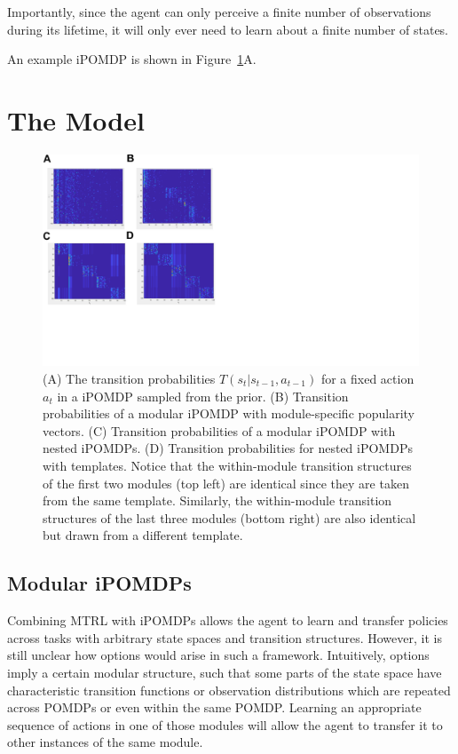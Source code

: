 \documentclass[11pt]{article}
\begin{document}
Importantly, since the agent can only perceive a finite number of observations during its lifetime, it will only ever need to learn about a finite number of states.

An example iPOMDP is shown in Figure~\ref{fig:nested}A.

\section{The Model}


\begin{figure}
\centering
\includegraphics[scale=1,  trim = 0 120 400 10]{figures/nested.pdf}
\caption{(A) The transition probabilities $T(s_t| s_{t-1}, a_{t-1})$ for a fixed action $a_t$ in a iPOMDP sampled from the prior. (B) Transition probabilities of a modular iPOMDP with module-specific popularity vectors. (C) Transition probabilities of a modular iPOMDP with nested iPOMDPs. (D) Transition probabilities for nested iPOMDPs with templates. Notice that the within-module transition structures of the first two modules (top left) are identical since they are taken from the same template. Similarly, the within-module transition structures of the last three modules (bottom right) are also identical but drawn from a different template.}
\label{fig:nested}
\end{figure}

\subsection{Modular iPOMDPs}

Combining MTRL with iPOMDPs allows the agent to learn and transfer policies across tasks with arbitrary state spaces and transition structures. However, it is still unclear how options would arise in such a framework. Intuitively, options imply a certain modular structure, such that some parts of the state space have characteristic transition functions or observation distributions which are repeated across POMDPs or even within the same POMDP. Learning an appropriate sequence of actions in one of those modules will allow the agent to transfer it to other instances of the same module. 
\end{document}

